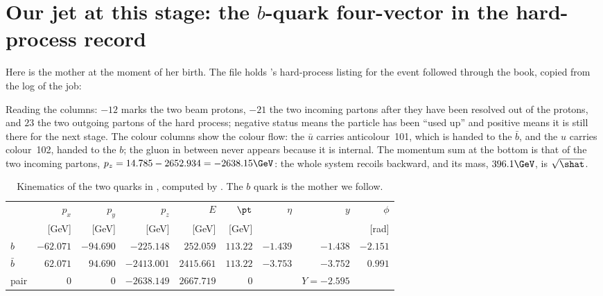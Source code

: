\section{Our jet at this stage: the \texorpdfstring{$b$}{b}-quark four-vector in the hard-process record}
\label{sec:ancestral_home:our_jet}

Here is the mother at the moment of her birth. The file
 holds \PYTHIA's hard-process listing for the
event followed through the book, copied from the log of the \CMSSW job:


Reading the columns:  $-12$ marks the two beam protons, $-21$ the
two incoming partons after they have been resolved out of the protons, and
$23$ the two outgoing partons of the hard process; negative status means the
particle has been ``used up'' and positive means it is still there for the
next stage. The colour columns show the colour flow: the $\bar u$ carries
anticolour~101, which is handed to the $\bar b$, and the $u$ carries
colour~102, handed to the $b$; the gluon in between never appears because it
is internal. The momentum sum at the bottom is that of the two incoming
partons, $p_z=14.785-2652.934=-2638.15\GeV$: the whole system recoils
backward, and its mass, $396.1\GeV$, is $\sqrt{\shat}$.

\begin{table}[htbp]\centering
\caption[Kinematics of the two quarks of our event]{Kinematics of the two
quarks in , computed by .
The $b$ quark is the mother we follow.}
\label{tab:ancestral_home:kinematics}
\begin{tabular}{lrrrrrrrr}\toprule
 & $p_x$ & $p_y$ & $p_z$ & $E$ & $\pt$ & $\eta$ & $y$ & $\phi$ \\
 & [GeV] & [GeV] & [GeV] & [GeV] & [GeV] & & & [rad] \\ \midrule
$b$       & $-62.071$ & $-94.690$ & $-225.148$  & $252.059$  & $113.22$ & $-1.439$ & $-1.438$ & $-2.151$ \\
$\bar b$  & $62.071$  & $94.690$  & $-2413.001$ & $2415.661$ & $113.22$ & $-3.753$ & $-3.752$ & $0.991$ \\ \midrule
pair      & $0$ & $0$ & $-2638.149$ & $2667.719$ & $0$ & & $Y=-2.595$ & \\
\bottomrule
\end{tabular}
\end{table}

